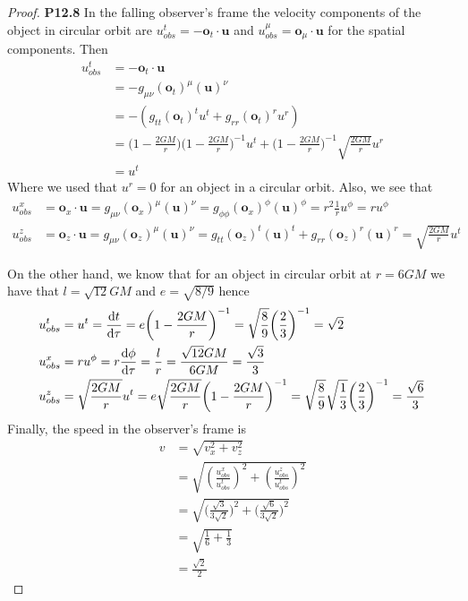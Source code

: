 \documentclass[11pt]{article}
\theoremstyle{definition}
\begin{document}
\begin{proof}{\textbf{P12.8}}
    In the falling observer's frame the velocity components of the object in
    circular orbit are $u^t_{obs} = -\bm{o}_t\cdot\bm{u}$ and 
    $u^\mu_{obs} = \bm{o}_\mu\cdot\bm{u}$ for the spatial components.
    Then
    \begin{align*}
        u^t_{obs} &= -\bm{o}_t\cdot\bm{u}\\
        &= -g_{\mu\nu}(\bm{o}_t)^\mu (\bm{u})^\nu\\
        &= -(g_{tt}(\bm{o}_t)^tu^t + g_{rr}(\bm{o}_t)^ru^r)\\
        &= \bigg(1- \frac{2GM}{r}\bigg)\bigg(1- \frac{2GM}{r}\bigg)^{-1}u^t
        + \bigg(1- \frac{2GM}{r}\bigg)^{-1}\sqrt{\frac{2GM}{r}} u^r\\
        &= u^t
    \end{align*}
    Where we used that $u^r = 0$ for an object in a circular orbit.
    Also, we see that
    \begin{align*}
        u^x_{obs} &= \bm{o}_x\cdot\bm{u}
        = g_{\mu\nu}(\bm{o}_x)^\mu (\bm{u})^\nu
        = g_{\phi\phi}(\bm{o}_x)^\phi (\bm{u})^\phi
        = r^2\frac{1}{r}u^{\phi}
        = ru^{\phi}\\
        u^z_{obs} &= \bm{o}_z\cdot\bm{u}
        = g_{\mu\nu}(\bm{o}_z)^\mu (\bm{u})^\nu
        = g_{tt}(\bm{o}_z)^t (\bm{u})^t + g_{rr}(\bm{o}_z)^r (\bm{u})^r
        = \sqrt{\frac{2GM}{r}}u^t
    \end{align*}

    On the other hand, we know that for an object in circular orbit at
    $r =6GM$ we have that $l = \sqrt{12}GM$ and $e = \sqrt{8/9}$ hence
    \begin{align*}
        u^t_{obs} &= u^t = \dv{t}{\tau} = e\bigg(1- \frac{2GM}{r}\bigg)^{-1}
        = \sqrt{\frac{8}{9}}\bigg(\frac{2}{3}\bigg)^{-1}
        = \sqrt{2}\\
        u^x_{obs} &= ru^\phi = r\dv{\phi}{\tau} = \frac{l}{r}
        = \frac{\sqrt{12}GM}{6GM}
        = \frac{\sqrt{3}}{3}\\
        u^z_{obs} &= \sqrt{\frac{2GM}{r}}u^t
        = e\sqrt{\frac{2GM}{r}}\bigg(1- \frac{2GM}{r}\bigg)^{-1}
        = \sqrt{\frac{8}{9}}\sqrt{\frac{1}{3}}\bigg(\frac{2}{3}\bigg)^{-1}
        = \frac{\sqrt{6}}{3}
    \end{align*}
    Finally, the speed in the observer's frame is
    \begin{align*}
        v &= \sqrt{v_x^2 + v_z^2}\\
        &= \sqrt{
            \left(\frac{u_{obs}^x}{u_{obs}^t}\right)^2
            + \left(\frac{u_{obs}^z}{u_{obs}^t}\right)^2
        }\\
        &= \sqrt{
            \bigg(\frac{\sqrt{3}}{3\sqrt{2}}\bigg)^2
            + \bigg(\frac{\sqrt{6}}{3\sqrt{2}}\bigg)^2
        }\\
        &= \sqrt{\frac{1}{6} + \frac{1}{3}}\\
        &= \frac{\sqrt{2}}{2}
    \end{align*}
\end{proof}
\end{document}
